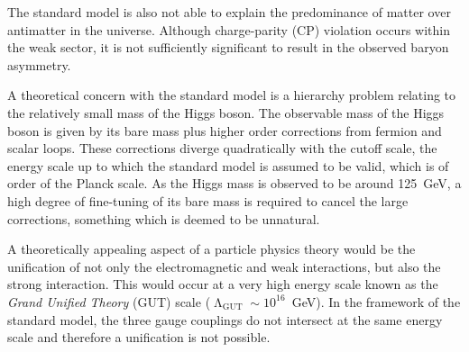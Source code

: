 The standard model is also not able to explain the predominance of matter over 
antimatter in the universe. Although charge-parity (CP) violation occurs within 
the weak sector, it is not sufficiently significant to result in the observed 
baryon asymmetry.

A theoretical concern with the standard model is a hierarchy problem relating 
to the relatively small mass of the Higgs boson. The observable mass of the 
Higgs boson is given by its bare mass plus higher order corrections from 
fermion and scalar loops. These 
corrections diverge quadratically with the cutoff scale, the energy scale up to 
which the standard model is assumed to be valid, which is of order of the %
Planck scale. 
As the Higgs mass is observed to be around 125~GeV, a high degree of 
fine-tuning of its bare mass is required to cancel the large corrections, 
something which is deemed to be unnatural. %

A theoretically appealing aspect of a particle physics theory would be the 
unification of not only the electromagnetic and weak interactions, but also the 
strong interaction. This would occur at a very high energy scale known as the 
\textit{Grand Unified Theory} (GUT) scale ($\upLambda_{\mathrm{GUT}} \sim 
10^{16}$~GeV). In the framework of the standard model, the three gauge 
couplings do not intersect at the same energy scale and therefore a unification 
is not possible.

